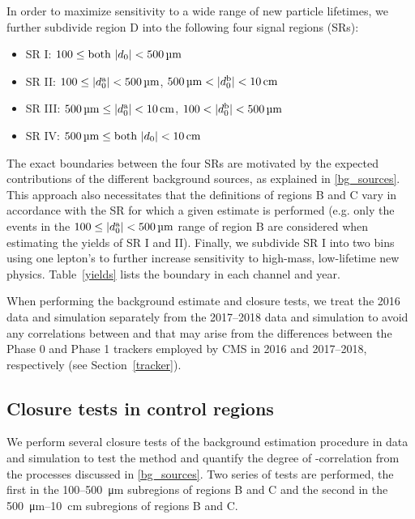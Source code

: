 In order to maximize sensitivity to a wide range of new particle lifetimes, we further subdivide region D into the following four signal regions (SRs):
\begin{itemize}
    \item SR I: $\num{100}\leq\text{both }\ad<\SI{500}{\um}$
    \item SR II: $\num{100}\leq\ada<\SI{500}{\um}$, $\SI{500}{\um}<\adb<\SI{10}{\cm}$
    \item SR III: $\SI{500}{\um} \leq \ada<\SI{10}{\cm}$, $\num{100} < \adb<\SI{500}{\um}$
    \item SR IV: $\SI{500}{\um} \leq \text{both }\ad<\SI{10}{\cm}$
\end{itemize}
The exact boundaries between the four SRs are motivated by the expected contributions of the different background sources, as explained in \ref{bg_sources}. This approach also necessitates that the definitions of regions B and C vary in accordance with the SR for which a given estimate is performed (e.g. only the events in the $\num{100}\leq\ada<\SI{500}{\um}$ range of region B are considered when estimating the yields of SR I and II). Finally, we subdivide SR I into two bins using one lepton's \pt to further increase sensitivity to high-mass, low-lifetime new physics. Table~\ref{yields} lists the \pt boundary in each channel and year.

When performing the background estimate and closure tests, we treat the 2016 data and simulation separately from the 2017--2018 data and simulation to avoid any correlations between \ada and \adb that may arise from the differences between the Phase 0 and Phase 1 trackers employed by CMS in 2016 and 2017--2018, respectively (see Section~\ref{tracker}).

\subsection{Closure tests in control regions}
\label{cr_closure_tests}

We perform several closure tests of the background estimation procedure in data and simulation to test the method and quantify the degree of \ada-\adb correlation from the processes discussed in \ref{bg_sources}. Two series of tests are performed, the first in the \num{100}--\SI{500}{\um} subregions of regions B and C and the second in the \SI{500}{\um}--\SI{10}{\cm} subregions of regions B and C.

